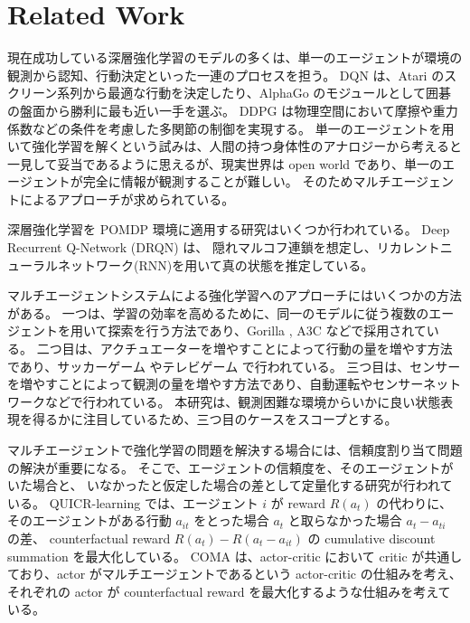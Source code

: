 \section{Related Work}
現在成功している深層強化学習のモデルの多くは、単一のエージェントが環境の観測から認知、行動決定といった一連のプロセスを担う。
DQN \citep{mnih2015human,silver2016mastering} は、Atari のスクリーン系列から最適な行動を決定したり、AlphaGo のモジュールとして囲碁の盤面から勝利に最も近い一手を選ぶ。
DDPG \citep{lillicrap2015continuous} は物理空間において摩擦や重力係数などの条件を考慮した多関節の制御を実現する。
単一のエージェントを用いて強化学習を解くという試みは、人間の持つ身体性のアナロジーから考えると一見して妥当であるように思えるが、現実世界は open world であり、単一のエージェントが完全に情報が観測することが難しい。
そのためマルチエージェントによるアプローチが求められている。

深層強化学習を POMDP 環境に適用する研究はいくつか行われている。
Deep Recurrent Q-Network (DRQN) \citep{sorokin2015deep} は、
隠れマルコフ連鎖を想定し、リカレントニューラルネットワーク(RNN)を用いて真の状態を推定している。

マルチエージェントシステムによる強化学習へのアプローチにはいくつかの方法がある。
一つは、学習の効率を高めるために、同一のモデルに従う複数のエージェントを用いて探索を行う方法であり、Gorilla \citep{nair2015massively} , A3C \citep{mnih2016asynchronous} などで採用されている。
二つ目は、アクチュエーターを増やすことによって行動の量を増やす方法であり、サッカーゲーム \citep{kalyanakrishnan2006half} やテレビゲーム \citep{tampuu2017multiagent} で行われている。
三つ目は、センサーを増やすことによって観測の量を増やす方法であり、自動運転\citep{sukhbaatar2016learning}やセンサーネットワーク\citep{fox2000probabilistic}などで行われている。
本研究は、観測困難な環境からいかに良い状態表現を得るかに注目しているため、三つ目のケースをスコープとする。


マルチエージェントで強化学習の問題を解決する場合には、信頼度割り当て問題の解決が重要になる。
そこで、エージェントの信頼度を、そのエージェントがいた場合と、
いなかったと仮定した場合の差として定量化する研究が行われている。
QUICR-learning \citep{agogino2006quicr} では、エージェント $i$ が reward $R(a_t)$ の代わりに、
そのエージェントがある行動 $a_{it}$ をとった場合 $a_t$ と取らなかった場合 $a_t-a_{ti}$ の差、
counterfactual reward $R(a_t) - R(a_t - a_{it})$ の cumulative discount summation を最大化している。
COMA \citep{foerster2017counterfactual} は、actor-critic において critic が共通しており、actor がマルチエージェントであるという actor-critic の仕組みを考え、それぞれの actor が counterfactual reward を最大化するような仕組みを考えている。

